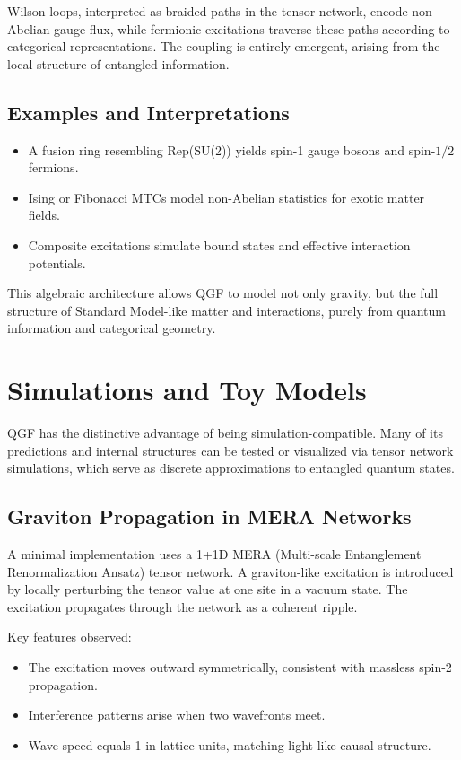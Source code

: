 \documentclass[11pt]{article}
\def\frac#1#2{#1/#2}
\begin{document}
Wilson loops, interpreted as braided paths in the tensor network, encode non-Abelian gauge flux, while fermionic excitations traverse these paths according to categorical representations. The coupling is entirely emergent, arising from the local structure of entangled information.

\subsection{Examples and Interpretations}

\begin{itemize}
    \item A fusion ring resembling Rep(SU(2)) yields spin-1 gauge bosons and spin-\( \frac{1}{2} \) fermions.
    \item Ising or Fibonacci MTCs model non-Abelian statistics for exotic matter fields.
    \item Composite excitations simulate bound states and effective interaction potentials.
\end{itemize}

This algebraic architecture allows QGF to model not only gravity, but the full structure of Standard Model-like matter and interactions, purely from quantum information and categorical geometry.



\section{Simulations and Toy Models}

QGF has the distinctive advantage of being simulation-compatible. Many of its predictions and internal structures can be tested or visualized via tensor network simulations, which serve as discrete approximations to entangled quantum states.

\subsection{Graviton Propagation in MERA Networks}

A minimal implementation uses a 1+1D MERA (Multi-scale Entanglement Renormalization Ansatz) tensor network. A graviton-like excitation is introduced by locally perturbing the tensor value at one site in a vacuum state. The excitation propagates through the network as a coherent ripple.

Key features observed:
\begin{itemize}
    \item The excitation moves outward symmetrically, consistent with massless spin-2 propagation.
    \item Interference patterns arise when two wavefronts meet.
    \item Wave speed equals 1 in lattice units, matching light-like causal structure.
\end{itemize}
\end{document}
